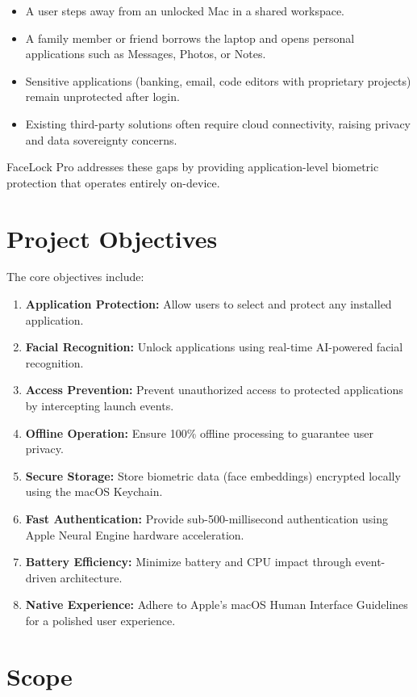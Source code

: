 \documentclass[12pt,a4paper]{report}
\begin{document}
\begin{itemize}[noitemsep]
    \item A user steps away from an unlocked Mac in a shared workspace.
    \item A family member or friend borrows the laptop and opens personal applications such as Messages, Photos, or Notes.
    \item Sensitive applications (banking, email, code editors with proprietary projects) remain unprotected after login.
    \item Existing third-party solutions often require cloud connectivity, raising privacy and data sovereignty concerns.
\end{itemize}

FaceLock Pro addresses these gaps by providing application-level biometric protection that operates entirely on-device.

\section{Project Objectives}
The core objectives include:
\begin{enumerate}[noitemsep]
    \item \textbf{Application Protection:} Allow users to select and protect any installed application.
    \item \textbf{Facial Recognition:} Unlock applications using real-time AI-powered facial recognition.
    \item \textbf{Access Prevention:} Prevent unauthorized access to protected applications by intercepting launch events.
    \item \textbf{Offline Operation:} Ensure 100\% offline processing to guarantee user privacy.
    \item \textbf{Secure Storage:} Store biometric data (face embeddings) encrypted locally using the macOS Keychain.
    \item \textbf{Fast Authentication:} Provide sub-500-millisecond authentication using Apple Neural Engine hardware acceleration.
    \item \textbf{Battery Efficiency:} Minimize battery and CPU impact through event-driven architecture.
    \item \textbf{Native Experience:} Adhere to Apple's macOS Human Interface Guidelines for a polished user experience.
\end{enumerate}

\section{Scope}
\end{document}
